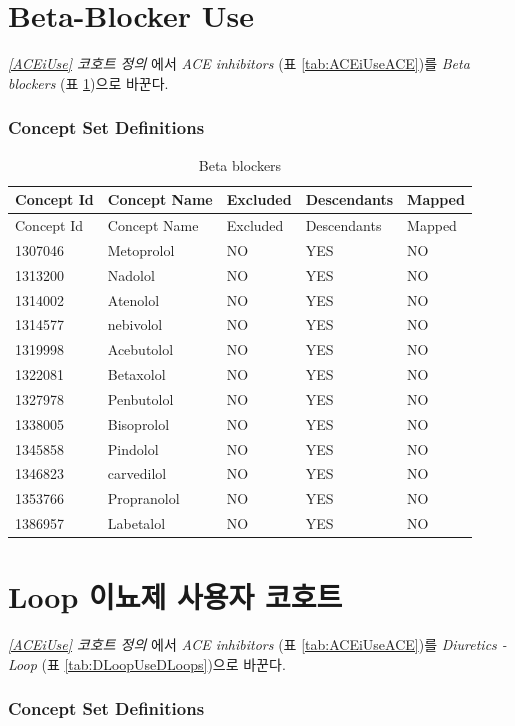 \documentclass[10.5pt]{book}
\theoremstyle{definition}
\theoremstyle{definition}
\theoremstyle{definition}
\theoremstyle{remark}
\begin{document}
\section{Beta-Blocker Use}\label{BBUse}

\emph{\ref{ACEiUse} 코호트 정의} 에서 \emph{ACE inhibitors} (표
\ref{tab:ACEiUseACE})를 \emph{Beta blockers} (표 \ref{tab:BBUseBB})으로
바꾼다.

\subsubsection*{Concept Set
Definitions}\label{concept-set-definitions-11}

\begin{longtable}[]{@{}lllll@{}}
\caption{\label{tab:BBUseBB} Beta blockers}\tabularnewline
\toprule
Concept Id & Concept Name & Excluded & Descendants &
Mapped\tabularnewline
\midrule
\endfirsthead
\toprule
Concept Id & Concept Name & Excluded & Descendants &
Mapped\tabularnewline
\midrule
\endhead
1307046 & Metoprolol & NO & YES & NO\tabularnewline
1313200 & Nadolol & NO & YES & NO\tabularnewline
1314002 & Atenolol & NO & YES & NO\tabularnewline
1314577 & nebivolol & NO & YES & NO\tabularnewline
1319998 & Acebutolol & NO & YES & NO\tabularnewline
1322081 & Betaxolol & NO & YES & NO\tabularnewline
1327978 & Penbutolol & NO & YES & NO\tabularnewline
1338005 & Bisoprolol & NO & YES & NO\tabularnewline
1345858 & Pindolol & NO & YES & NO\tabularnewline
1346823 & carvedilol & NO & YES & NO\tabularnewline
1353766 & Propranolol & NO & YES & NO\tabularnewline
1386957 & Labetalol & NO & YES & NO\tabularnewline
\bottomrule
\end{longtable}

\section{Loop 이뇨제 사용자 코호트}\label{DLoopUse}

\emph{\ref{ACEiUse} 코호트 정의} 에서 \emph{ACE inhibitors} (표
\ref{tab:ACEiUseACE})를 \emph{Diuretics - Loop} (표
\ref{tab:DLoopUseDLoops})으로 바꾼다.

\subsubsection*{Concept Set
Definitions}\label{concept-set-definitions-12}
\end{document}
